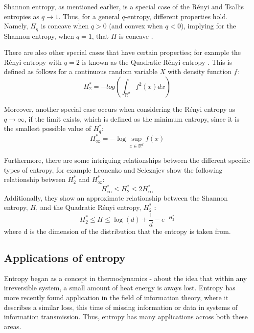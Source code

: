 \documentclass[12pt]{report}
\begin{document}
Shannon entropy, as mentioned earlier, is a special case of the R\'enyi and Tsallis entropies as $q \to 1$. Thus, for a general $q$-entropy, different properties hold. Namely, $H_{q}$ is concave when $q > 0$ (and convex when $q<0$), implying for the Shannon entropy, when $q=1$, that $H$ is concave \cite{paper2}.

There are also other special cases that have certain properties; for example the R\'enyi entropy with $q=2$ is known as the Quadratic R\'enyi entropy \cite{paper5}. This is defined as follows for a continuous random variable $X$ with density function $f$:
\begin{equation} 
H_{2}^{*} = - log\left( \int_{\mathbb{R}^{d}} f^2(x) dx \right) \label{QuadRenEnt} 
\end{equation} 

Moreover, another special case occurs when considering the R\'enyi entropy as $q \to \infty$, if the limit exists, which is defined as the minimum entropy, since it is the smallest possible value of $H_{q}^{*}$:
\begin{equation}
H_{\infty}^{*} = - \log \sup_{x \in \mathbb{R}^d} f (x) \nonumber
\end{equation}

Furthermore, there are some intriguing relationships between the different specific types of entropy, for example Leonenko and Seleznjev \cite{paper5} show the following relationship between $H_{2}^{*}$ and $H_{\infty}^{*}$:
\begin{equation}
H_{\infty}^{*} \leq H_{2}^{*} \leq 2H_{\infty}^{*}
\end{equation}
Additionally, they show an approximate relationship between the Shannon entropy, $H$, and the Quadratic R\'enyi entropy, $ H_{2}^{*}$ :
\begin{equation}
H_{2}^{*} \leq H \leq \log(d) + \frac{1}{d} - e^{-H_{2}^{*}} \nonumber
\end{equation}
where d is the dimension of the distribution that the entropy is taken from.




\subsection{Applications of entropy}

Entropy began as a concept in thermodynamics - about the idea that within any irreversible system, a small amount of heat energy is aways lost. Entropy has more recently found application in the field of information theory, where it describes a similar loss, this time of missing information or data in systems of information transmission. Thus, entropy has many applications across both these areas.
\end{document}
